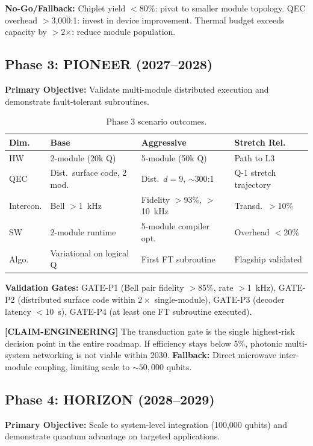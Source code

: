 \documentclass[conference]{IEEEtran}
\begin{document}
\textbf{No-Go/Fallback:} Chiplet yield $<$80\%: pivot to smaller module topology. QEC overhead $>$3,000:1: invest in device improvement. Thermal budget exceeds capacity by $>$2$\times$: reduce module population.

\subsection{Phase 3: PIONEER (2027--2028)}

\textbf{Primary Objective:} Validate multi-module distributed execution and demonstrate fault-tolerant subroutines.

\begin{table}[H]
\centering
\caption{Phase 3 scenario outcomes.}
\begin{tabular}{@{}l L{2cm} L{2cm} L{2cm}@{}}
\toprule
\textbf{Dim.} & \textbf{Base} & \textbf{Aggressive} & \textbf{Stretch Rel.} \\
\midrule
HW & 2-module (20k Q) & 5-module (50k Q) & Path to L3 \\
QEC & Dist.\ surface code, 2 mod. & Dist.\ $d{=}9$, ${\sim}300$:1 & Q-1 stretch trajectory \\
Intercon. & Bell $>$1~kHz & Fidelity $>$93\%, $>$10~kHz & Transd.\ $>$10\% \\
SW & 2-module runtime & 5-module compiler opt. & Overhead $<$20\% \\
Algo. & Variational on logical Q & First FT subroutine & Flagship validated \\
\bottomrule
\end{tabular}
\end{table}

\textbf{Validation Gates:} GATE-P1 (Bell pair fidelity $>$85\%, rate $>$1~kHz), GATE-P2 (distributed surface code within $2\times$ single-module), GATE-P3 (decoder latency $<$10~\textmu s), GATE-P4 (at least one FT subroutine executed).

\textbf{[CLAIM-ENGINEERING]} The transduction gate is the single highest-risk decision point in the entire roadmap. If efficiency stays below 5\%, photonic multi-system networking is not viable within 2030. \textbf{Fallback:} Direct microwave inter-module coupling, limiting scale to ${\sim}50{,}000$ qubits.

\subsection{Phase 4: HORIZON (2028--2029)}

\textbf{Primary Objective:} Scale to system-level integration (100,000 qubits) and demonstrate quantum advantage on targeted applications.
\end{document}
